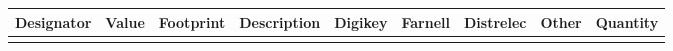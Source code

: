 \documentclass[11pt, landscape]{article}
\begin{document}
 
\begin{tabular}{|c|c|c|c|c|c|c|c|c|}
\hline Designator & Value & Footprint & Description & Digikey & Farnell & Distrelec & Other & Quantity \\ 
\hline  &  &  &  &  &  &  &  &  \\ 
\hline 
\end{tabular} 
                                                                           
\end{document}
